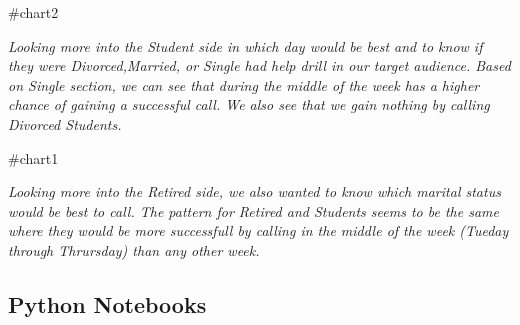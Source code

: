\documentclass[
  letterpaper,
  DIV=11,
  numbers=noendperiod]{scrartcl}
\newenvironment{Shaded}{\begin{snugshade}}{\end{snugshade}}
\newcommand{\CommentTok}[1]{\textcolor[rgb]{0.37,0.37,0.37}{#1}}
\begin{document}
\begin{Shaded}
\begin{Highlighting}[]
\CommentTok{\#chart2}
\end{Highlighting}
\end{Shaded}

\emph{Looking more into the Student side in which day would be best and
to know if they were Divorced,Married, or Single had help drill in our
target audience. Based on Single section, we can see that during the
middle of the week has a higher chance of gaining a successful call. We
also see that we gain nothing by calling Divorced Students.}

\begin{Shaded}
\begin{Highlighting}[]
\CommentTok{\#chart1}
\end{Highlighting}
\end{Shaded}

\emph{Looking more into the Retired side, we also wanted to know which
marital status would be best to call. The pattern for Retired and
Students seems to be the same where they would be more successfull by
calling in the middle of the week (Tueday through Thrursday) than any
other week.}

\hypertarget{python-notebooks}{%
\subsection{Python Notebooks}\label{python-notebooks}}
\end{document}
